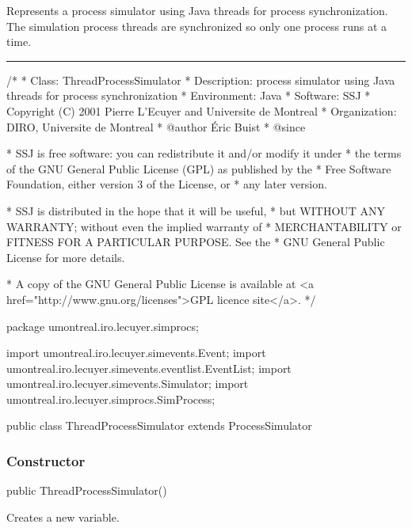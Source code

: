 
Represents a process simulator using Java threads for process synchronization.
The simulation process threads are synchronized so only one process runs
at a time.

\bigskip\hrule

\begin{code}
\begin{hide}
/*
 * Class:        ThreadProcessSimulator
 * Description:  process simulator using Java threads for process synchronization
 * Environment:  Java
 * Software:     SSJ 
 * Copyright (C) 2001  Pierre L'Ecuyer and Universite de Montreal
 * Organization: DIRO, Universite de Montreal
 * @author       Éric Buist
 * @since

 * SSJ is free software: you can redistribute it and/or modify it under
 * the terms of the GNU General Public License (GPL) as published by the
 * Free Software Foundation, either version 3 of the License, or
 * any later version.

 * SSJ is distributed in the hope that it will be useful,
 * but WITHOUT ANY WARRANTY; without even the implied warranty of
 * MERCHANTABILITY or FITNESS FOR A PARTICULAR PURPOSE.  See the
 * GNU General Public License for more details.

 * A copy of the GNU General Public License is available at
   <a href="http://www.gnu.org/licenses">GPL licence site</a>.
 */
\end{hide}
package umontreal.iro.lecuyer.simprocs;\begin{hide}

import umontreal.iro.lecuyer.simevents.Event;
import umontreal.iro.lecuyer.simevents.eventlist.EventList;
import umontreal.iro.lecuyer.simevents.Simulator;
import umontreal.iro.lecuyer.simprocs.SimProcess;\end{hide}

public class ThreadProcessSimulator extends ProcessSimulator \begin{hide} {

   private SimThread threadAllHead = null;
   //Tete de la liste des SimThread associated to this ThreadProcessSimulator
\end{hide}
\end{code}

\subsubsection* {Constructor}
\begin{code}
   public ThreadProcessSimulator() \begin{hide} {
   }\end{hide}
\end{code}
\begin{tabb}   Creates a new  variable.
  \end{tabb}

